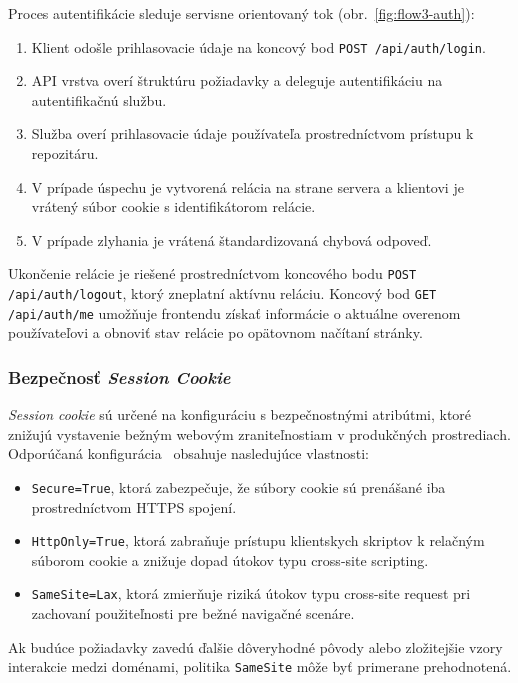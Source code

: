 Proces autentifikácie sleduje servisne orientovaný tok (obr.~\ref{fig:flow3-auth}):

\begin{enumerate}
    \item Klient odošle prihlasovacie údaje na koncový bod \texttt{POST /api/auth/login}.
    \item API vrstva overí štruktúru požiadavky a deleguje autentifikáciu na autentifikačnú službu.
    \item Služba overí prihlasovacie údaje používateľa prostredníctvom prístupu k repozitáru.
    \item V prípade úspechu je vytvorená relácia na strane servera a klientovi je vrátený
    súbor cookie s identifikátorom relácie.
    \item V prípade zlyhania je vrátená štandardizovaná chybová odpoveď.
\end{enumerate}

Ukončenie relácie je riešené prostredníctvom koncového bodu \texttt{POST /api/auth/logout}, ktorý zneplatní aktívnu reláciu. Koncový bod \texttt{GET /api/auth/me} umožňuje frontendu získať informácie o aktuálne overenom používateľovi a obnoviť stav relácie po opätovnom načítaní stránky.


\subsubsection{Bezpečnosť \textit{Session Cookie}}

\textit{Session cookie} sú určené na konfiguráciu s bezpečnostnými atribútmi, ktoré znižujú vystavenie bežným webovým zraniteľnostiam v produkčných prostrediach. Odporúčaná konfigurácia~\cite{owasp_session_management_cheatsheet} obsahuje nasledujúce vlastnosti:

\begin{itemize}
    \item \texttt{Secure=True}, ktorá zabezpečuje, že súbory cookie sú prenášané iba
    prostredníctvom HTTPS spojení.
    \item \texttt{HttpOnly=True}, ktorá zabraňuje prístupu klientskych skriptov k
    relačným súborom cookie a znižuje dopad útokov typu cross-site scripting.
    \item \texttt{SameSite=Lax}, ktorá zmierňuje riziká útokov typu cross-site request
    pri zachovaní použiteľnosti pre bežné navigačné scenáre.
\end{itemize}

Ak budúce požiadavky zavedú ďalšie dôveryhodné pôvody alebo zložitejšie vzory interakcie medzi doménami, politika \texttt{SameSite} môže byť primerane prehodnotená.

\clearpage
